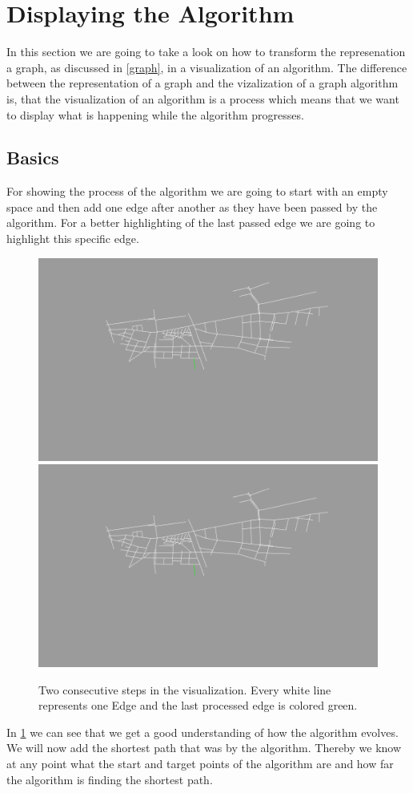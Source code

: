 \documentclass
[
	paper = a4,
    pagesize,
	12 pt,
	oneside,                       %
    open = right,
	DIV = calc,
	BCOR = 0 mm,                   %
	bibtotoc
]
{scrbook}
\begin{document}
\section{Displaying the Algorithm}

In this section we are going to take a look on how to transform the represenation a graph, as discussed in \cref{graph}, in a visualization of an algorithm.
The difference between the representation of a graph and the vizalization of a graph algorithm is, that the visualization of an algorithm is a process which means that we want to display what is happening while the algorithm progresses.

\subsection{Basics}
For showing the process of the algorithm we are going to start with an empty space and then add one edge after another as they have been passed by the algorithm.
For a better highlighting of the last passed edge we are going to highlight this specific edge.

\begin{figure}[H]
	\includegraphics[width=.5\textwidth]{Images/vis-step-one.png}
	\includegraphics[width=.5\textwidth]{Images/vis-step-one.png}
\caption[]{Two consecutive steps in the visualization. Every white line represents one Edge and the last processed edge is colored green.}
\label{fig:two-steps}
\end{figure}

In \cref{fig:two-steps} we can see that we get a good understanding of how the algorithm evolves.
We will now add the shortest path that was by the algorithm.
Thereby we know at any point what the start and target points of the algorithm are and how far the algorithm is finding the shortest path.
\end{document}
